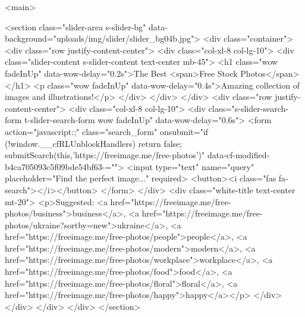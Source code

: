 <main>

<section class="slider-area s-slider-bg" data-background="uploads/img/slider/slider_bg04b.jpg">
<div class="container">
<div class="row justify-content-center">
<div class="col-xl-8 col-lg-10">
<div class="slider-content s-slider-content text-center mb-45">
<h1 class="wow fadeInUp" data-wow-delay="0.2s">The Best <span>Free Stock Photos</span></h1>
<p class="wow fadeInUp" data-wow-delay="0.4s">Amazing collection of images and illustrations!</p>
</div>
</div>
</div>
<div class="row justify-content-center">
<div class="col-xl-8 col-lg-10">
<div class="s-slider-search-form t-slider-search-form wow fadeInUp" data-wow-delay="0.6s">
<form action="javascript:;" class="search_form" onsubmit="if (!window.__cfRLUnblockHandlers) return false; submitSearch(this,'https://freeimage.me/free-photos')" data-cf-modified-b4ca705093c5f09bde54bf63-="">
<input type="text" name="query" placeholder="Find the perfect image..." required>
<button><i class="fas fa-search"></i></button>
</form>
</div>
<div class="white-title text-center mt-20">
<p>Suggested: <a href="https://freeimage.me/free-photos/business">business</a>, <a href="https://freeimage.me/free-photos/ukraine?sortby=new">ukraine</a>, <a href="https://freeimage.me/free-photos/people">people</a>, <a href="https://freeimage.me/free-photos/modern">modern</a>, <a href="https://freeimage.me/free-photos/workplace">workplace</a>, <a href="https://freeimage.me/free-photos/food">food</a>, <a href="https://freeimage.me/free-photos/floral">floral</a>, <a href="https://freeimage.me/free-photos/happy">happy</a></p>
</div>
</div>
</div>
</div>
</section>


